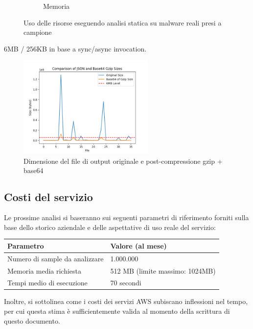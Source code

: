 \begin{figure}[H]
\begin{subfigure}[b]{0.5\textwidth}
         \caption{Memoria}
         \label{fig:static_analysis_exec_memory}
     \end{subfigure}
     \label{fig_static_analysis_exec_stats}
     \caption{Uso delle risorse eseguendo analisi statica su malware reali presi a campione}
\end{figure}

6MB / 256KB in base a sync/async invocation.

\begin{figure}[H]
    \centering
    \includegraphics[width=0.6\textwidth]{assets/static_analysis_results_size.png}
    \caption{Dimensione del file di output originale e post-compressione gzip + base64}
    \label{fig:static_analysis_results_size}
\end{figure}

\subsection{Costi del servizio}
Le prossime analisi si baseranno sui seguenti parametri di riferimento forniti sulla base dello storico aziendale e delle aspettative di uso reale del servizio:
\begin{table}[H]
    \centering
    \begin{tabular}{|l|l|}
        \hline
        \textbf{Parametro}             & \textbf{Valore (al mese)}       \\ \hline
        Numero di sample da analizzare & 1.000.000                       \\
        Memoria media richiesta        & 512 MB (limite massimo: 1024MB) \\
        Tempi medio di esecuzione      & 70 secondi                      \\ \hline
    \end{tabular}
\end{table}

Inoltre, si sottolinea come i costi dei servizi AWS subiscano inflessioni nel tempo, per cui questa stima è sufficientemente valida al momento della scrittura di questo documento.

